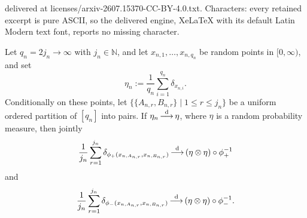 \documentclass[10pt,a4paper]{amsart}
\newcommand{\convdis}{\,{\buildrel \mathrm{d} \over \longrightarrow}\,}
\newcommand{\ndN}{\mathbb{N}}
\begin{document}
delivered at licenses/arxiv-2607.15370-CC-BY-4.0.txt. Characters: every retained excerpt is pure ASCII, so the delivered engine, XeLaTeX with its default Latin Modern text font, reports no missing character.
\begin{lemma}
	\label{le:matching}
	Let $q_n = 2j_n \to \infty$ with $j_n \in \ndN$, and let $x_{n,1}, \ldots, x_{n,q_n}$ be random points in $[0,\infty)$, and set
	\[
		\eta_n := \frac{1}{q_n}\sum_{i=1}^{q_n}\delta_{x_{n,i}}.
	\]
	Conditionally on these points, let $\{\{A_{n,r},B_{n,r}\} \mid 1\le r\le j_n\}$ be a uniform ordered partition of $[q_n]$ into pairs. If $\eta_n\convdis\eta$, where $\eta$ is a random probability measure, then jointly
	\[
		\frac{1}{j_n}\sum_{r=1}^{j_n} \delta_{\phi_+(x_{n,A_{n,r}},x_{n,B_{n,r}})} \convdis(\eta\otimes\eta)\circ\phi_+^{-1}
	\]
	and
	\[
		\frac{1}{j_n}\sum_{r=1}^{j_n} \delta_{\phi_-(x_{n,A_{n,r}},x_{n,B_{n,r}})} \convdis(\eta\otimes\eta)\circ\phi_-^{-1}.
	\]
\end{lemma}
\end{document}
